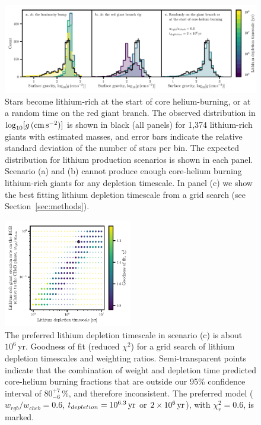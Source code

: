 \documentclass[twocolumn]{aastex62}
\newcommand{\logg}{\log_{10}[g\,({\rm cm\,s}^{-2})]}
\begin{document}
\begin{figure}[t!]
	\includegraphics[width=\textwidth]{ref_timescales}
	\caption{{Stars become lithium-rich at the start of core helium-burning, or at a random time on the red giant branch.} The observed distribution in $\logg$ is shown in black (all panels) for 1,374 lithium-rich giants with estimated masses, and error bars indicate the relative standard deviation of the number of stars per bin. The expected distribution for lithium production scenarios is shown in each panel. Scenario (a) and (b) cannot produce enough core-helium burning lithium-rich giants for any depletion timescale. In panel (c) we show the best fitting lithium depletion timescale from a grid search (see Section~\ref{sec:methods}).}
	\label{fig:evtracks}
\end{figure}



\begin{figure}
	\includegraphics[width=0.5\textwidth]{ref_bump_plus_8_scenario_c_grid_search}
	\caption{The preferred  lithium depletion timescale in scenario (c) is about $10^6$\,yr. Goodness of fit (reduced $\chi^2$) for a grid search of lithium depletion timescales and weighting ratios. Semi-transparent points indicate that the combination of weight and depletion time predicted core-helium burning fractions that are outside our 95\% confidence interval of $80^{+7}_{-6}$\,\%, and therefore inconsistent.  The preferred model ($w_{rgb}/w_{cheb} = 0.6$, $t_{depletion} = 10^{6.3}\,{\rm yr}$ or $2\times10^6\,{\rm yr}$), with $\chi_r^2 = 0.6$, is marked.}
	\label{fig:grid_search}
\end{figure}
\end{document}
